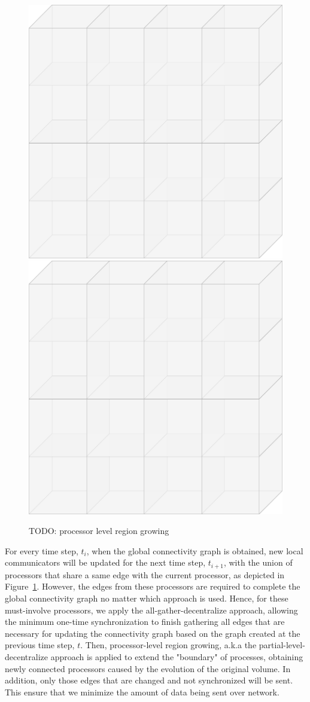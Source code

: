 \documentclass[10pt, conference, compsocconf]{IEEEtran}
\begin{document}
\begin{figure}[ht]
	\centering
	\includegraphics[width=0.45\linewidth]{grid2d.png}
	\includegraphics[width=0.45\linewidth]{grid2d.png}
	\caption{TODO: processor level region growing}
	\label{fig:hybrid}
\end{figure}

For every time step, $t_i$, when the global connectivity graph is obtained, new local communicators will be updated for the next time step, $t_{i+1}$, with the union of processors that share a same edge with the current processor, as depicted in Figure~\ref{fig:hybrid}. However, the edges from these processors are required to complete the global connectivity graph no matter which approach is used. Hence, for these must-involve processors, we apply the all-gather-decentralize approach, allowing the minimum one-time synchronization to finish gathering all edges that are necessary for updating the connectivity graph based on the graph created at the previous time step, $t$. Then, processor-level region growing, a.k.a the partial-level-decentralize approach is applied to extend the "boundary" of processes, obtaining newly connected processors caused by the evolution of the original volume. In addition, only those edges that are changed and not synchronized will be sent. This ensure that we minimize the amount of data being sent over network.
\end{document}

